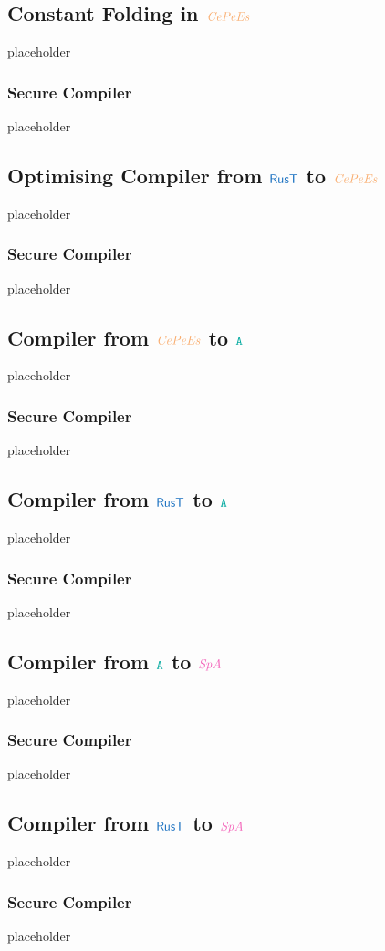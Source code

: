 \documentclass[a4paper,12pt]{article}
\begin{document}
\subsection{Constant Folding in $\irl{CePeEs}$}\label{subsec-cf-in-cepees}
placeholder
\subsubsection{Secure Compiler}\label{subsec-cf-cepees-seccomp}
placeholder

\subsection{Optimising Compiler from $\src{RusT}$ to $\irl{CePeEs}$}\label{subsec-optimising-rust-to-cepees}
placeholder
\subsubsection{Secure Compiler}\label{subsec-optimising-rust-to-cepees-seccomp}
placeholder




\subsection{Compiler from $\irl{CePeEs}$ to $\obj{A}$}\label{subsec-cepees-to-a}
placeholder
\subsubsection{Secure Compiler}\label{subsec-cepees-to-a-seccomp}
placeholder

\subsection{Compiler from $\src{RusT}$ to $\obj{A}$}\label{subsec-rust-to-a}
placeholder
\subsubsection{Secure Compiler}\label{subsec-rust-to-a-seccomp}
placeholder




\subsection{Compiler from $\obj{A}$ to $\ird{SpA}$}\label{subsec-a-to-spa}
placeholder
\subsubsection{Secure Compiler}\label{subsec-a-to-spa-seccomp}
placeholder

\subsection{Compiler from $\src{RusT}$ to $\ird{SpA}$}\label{subsec-rust-to-spa}
placeholder
\subsubsection{Secure Compiler}\label{subsec-rust-to-spa-seccomp}
placeholder


\clearpage



\printglossary
\end{document}
